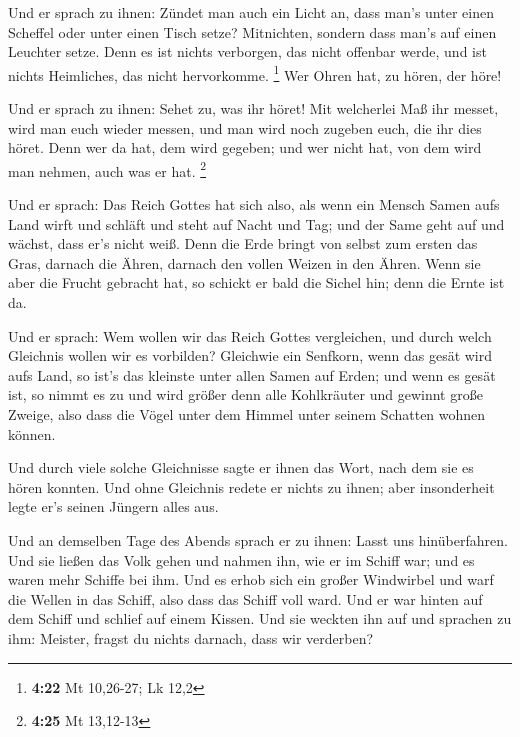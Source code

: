  Und er sprach zu ihnen: Zündet man auch ein Licht an,
dass man's unter einen Scheffel oder unter einen Tisch setze?
Mitnichten, sondern dass man's auf einen Leuchter setze. 
Denn es ist nichts verborgen, das nicht offenbar werde, und ist nichts
Heimliches, das nicht hervorkomme. \footnote{\textbf{4:22} Mt 10,26-27;
  Lk 12,2}  Wer Ohren hat, zu hören, der höre!

 Und er sprach zu ihnen: Sehet zu, was ihr höret! Mit
welcherlei Maß ihr messet, wird man euch wieder messen, und man wird
noch zugeben euch, die ihr dies höret.  Denn wer da hat,
dem wird gegeben; und wer nicht hat, von dem wird man nehmen, auch was
er hat. \footnote{\textbf{4:25} Mt 13,12-13}

 Und er sprach: Das Reich Gottes hat sich also, als wenn
ein Mensch Samen aufs Land wirft  und schläft und steht
auf Nacht und Tag; und der Same geht auf und wächst, dass er's nicht
weiß.  Denn die Erde bringt von selbst zum ersten das
Gras, darnach die Ähren, darnach den vollen Weizen in den Ähren.
 Wenn sie aber die Frucht gebracht hat, so schickt er
bald die Sichel hin; denn die Ernte ist da.

 Und er sprach: Wem wollen wir das Reich Gottes
vergleichen, und durch welch Gleichnis wollen wir es vorbilden?
 Gleichwie ein Senfkorn, wenn das gesät wird aufs Land,
so ist's das kleinste unter allen Samen auf Erden;  und
wenn es gesät ist, so nimmt es zu und wird größer denn alle Kohlkräuter
und gewinnt große Zweige, also dass die Vögel unter dem Himmel unter
seinem Schatten wohnen können.

 Und durch viele solche Gleichnisse sagte er ihnen das
Wort, nach dem sie es hören konnten.  Und ohne Gleichnis
redete er nichts zu ihnen; aber insonderheit legte er's seinen Jüngern
alles aus.

 Und an demselben Tage des Abends sprach er zu ihnen:
Lasst uns hinüberfahren.  Und sie ließen das Volk gehen
und nahmen ihn, wie er im Schiff war; und es waren mehr Schiffe bei ihm.
 Und es erhob sich ein großer Windwirbel und warf die
Wellen in das Schiff, also dass das Schiff voll ward. 
Und er war hinten auf dem Schiff und schlief auf einem Kissen. Und sie
weckten ihn auf und sprachen zu ihm: Meister, fragst du nichts darnach,
dass wir verderben?

